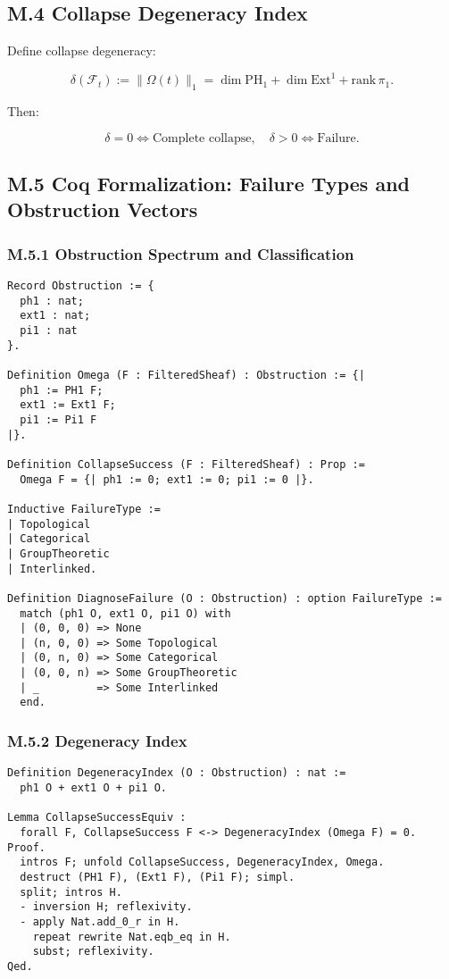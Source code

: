 \documentclass[11pt]{article}
\begin{document}
\subsection*{M.4 Collapse Degeneracy Index}

Define collapse degeneracy:

\[
\delta(\mathcal{F}_t) := \|\Omega(t)\|_1 = 
\dim \mathrm{PH}_1 + \dim \mathrm{Ext}^1 + \mathrm{rank}\, \pi_1.
\]

Then:

\[
\delta = 0 \iff \text{Complete collapse},\quad \delta > 0 \iff \text{Failure}.
\]

\subsection*{M.5 Coq Formalization: Failure Types and Obstruction Vectors}

\subsubsection*{M.5.1 Obstruction Spectrum and Classification}

\begin{lstlisting}[language=Coq, caption=Obstruction Spectrum and Failure Typing, captionpos=b]
Record Obstruction := {
  ph1 : nat;
  ext1 : nat;
  pi1 : nat
}.

Definition Omega (F : FilteredSheaf) : Obstruction := {|
  ph1 := PH1 F;
  ext1 := Ext1 F;
  pi1 := Pi1 F
|}.

Definition CollapseSuccess (F : FilteredSheaf) : Prop :=
  Omega F = {| ph1 := 0; ext1 := 0; pi1 := 0 |}.

Inductive FailureType :=
| Topological
| Categorical
| GroupTheoretic
| Interlinked.

Definition DiagnoseFailure (O : Obstruction) : option FailureType :=
  match (ph1 O, ext1 O, pi1 O) with
  | (0, 0, 0) => None
  | (n, 0, 0) => Some Topological
  | (0, n, 0) => Some Categorical
  | (0, 0, n) => Some GroupTheoretic
  | _         => Some Interlinked
  end.
\end{lstlisting}

\subsubsection*{M.5.2 Degeneracy Index}

\begin{lstlisting}[language=Coq, caption=Collapse Degeneracy Metric, captionpos=b]
Definition DegeneracyIndex (O : Obstruction) : nat :=
  ph1 O + ext1 O + pi1 O.

Lemma CollapseSuccessEquiv :
  forall F, CollapseSuccess F <-> DegeneracyIndex (Omega F) = 0.
Proof.
  intros F; unfold CollapseSuccess, DegeneracyIndex, Omega.
  destruct (PH1 F), (Ext1 F), (Pi1 F); simpl.
  split; intros H.
  - inversion H; reflexivity.
  - apply Nat.add_0_r in H.
    repeat rewrite Nat.eqb_eq in H.
    subst; reflexivity.
Qed.
\end{lstlisting}
\end{document}
